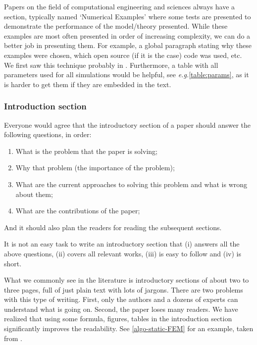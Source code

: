 \documentclass[authoryear,12pta4paper,fleqn]{article}
\newcommand{\eg}{\textit{e.g.}\xspace}
\numberwithin{equation}{section}
\theoremstyle{remark}
\begin{document}
Papers on the field of computational engineering and sciences always have a section, typically named `Numerical Examples' where some tests are presented to demonstrate the performance of the model/theory presented. While these examples are most often presented in order of increasing complexity, we can do a better job in presenting them. For example, a global paragraph stating why these examples were chosen, which open source (if it is the case) code was used, etc. We first saw this technique probably in \cite{huang2003modeling}. Furthermore, a table with all parameters used for all simulations would be helpful, see \eg \cref{table:params}, as it is harder to get them if they are embedded in the text.

\subsubsection{Introduction section}\label{sec:introduction-part}

Everyone would agree that the introductory section of a paper should answer the following questions, in order:

\begin{enumerate}
\item What is the problem that the paper is solving;
\item Why that problem (the importance of the problem);
\item What are the current approaches to solving this problem and what is wrong about them;
\item What are the contributions of the paper; 
\end{enumerate}
And it should also plan  the readers for reading the subsequent sections.

It is not an easy task to write an introductory section that (i) answers all the above questions, (ii) covers all relevant works, (iii) is easy to follow and (iv) is short.

What we commonly see in the literature is introductory sections of about two to three pages, full of just plain text with lots of jargons. There are two problems with this type of writing. First, only the authors and a dozens of experts can understand what is going on. Second, the paper loses many readers. We have realized that using some formula, figures, tables in the introduction section significantly improves the readability.
See \cref{algo-static-FEM} for an example, taken from \cite{Mandal:EFM2019}.
\end{document}
